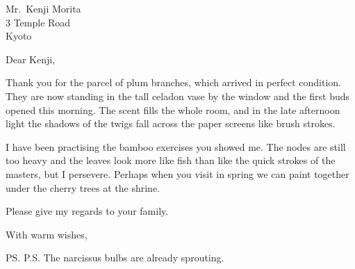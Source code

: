 \documentclass[11pt]{letter}
\begin{document}
\begin{letter}{Mr.\ Kenji Morita\\ 3 Temple Road\\ Kyoto}
\opening{Dear Kenji,}
Thank you for the parcel of plum branches, which arrived in perfect
condition. They are now standing in the tall celadon vase by the window and
the first buds opened this morning. The scent fills the whole room, and in
the late afternoon light the shadows of the twigs fall across the paper
screens like brush strokes.

I have been practising the bamboo exercises you showed me. The nodes are
still too heavy and the leaves look more like fish than like the quick
strokes of the masters, but I persevere. Perhaps when you visit in spring we
can paint together under the cherry trees at the shrine.

Please give my regards to your family.
\closing{With warm wishes,}
\ps{P.S. The narcissus bulbs are already sprouting.}
\end{letter}
\end{document}
